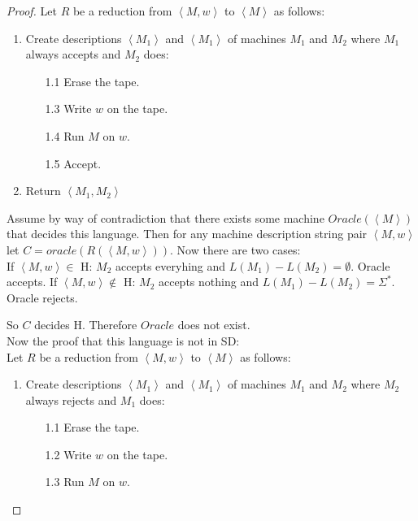 \documentclass[10pt]{article}
\newcommand{\brackets}[1]{\left< #1 \right>}
\begin{document}
\begin{enumerate}[1)]
\begin{enumerate}[a)]
\begin{proof}[Proof]
Let $R$ be a reduction from $\brackets{M, w}$ to $\brackets{M}$ as follows:
\begin{enumerate}[1.]
\item
Create descriptions $\brackets{M_1}$ and $\brackets{M_1}$ of machines $M_1$ and $M_2$ where $M_1$ always accepts and $M_2$ does:\\

\begin{enumerate}
\item[1.1]
Erase the tape.

\item[1.3]
Write $w$ on the tape.

\item[1.4]
Run $M$ on $w$.

\item[1.5]
Accept.
\end{enumerate}
\item
Return $\brackets{M_1, M_2}$
\end{enumerate}

Assume by way of contradiction that there exists some machine $Oracle(\brackets{M})$ that decides this language.  Then for any machine description string pair $\brackets{M, w}$ let $C = oracle(R(\brackets{M, w}))$. Now there are two cases:\\

If $\brackets{M, w} \in$ H: $M_2$ accepts everyhing and $L(M_1) - L(M_2) = \emptyset$.  Oracle accepts.
If $\brackets{M, w} \not \in$ H: $M_2$ accepts nothing and $L(M_1) - L(M_2) = \Sigma ^*$.  Oracle rejects.

So $C$ decides H.  Therefore $Oracle$ does not exist.\\

\vspace{1cm}
\noindent
Now the proof that this language is not in SD:\\
Let $R$ be a reduction from $\brackets{M, w}$ to $\brackets{M}$ as follows:
\begin{enumerate}[1.]
\item
Create descriptions $\brackets{M_1}$ and $\brackets{M_1}$ of machines $M_1$ and $M_2$ where $M_2$ always rejects and $M_1$ does:\\
\begin{enumerate}
\item[1.1]
Erase the tape.

\item[1.2]
Write $w$ on the tape.

\item[1.3]
Run $M$ on $w$.


\end{enumerate}
\end{enumerate}
\end{proof}
\end{enumerate}
\end{enumerate}
\end{document}
